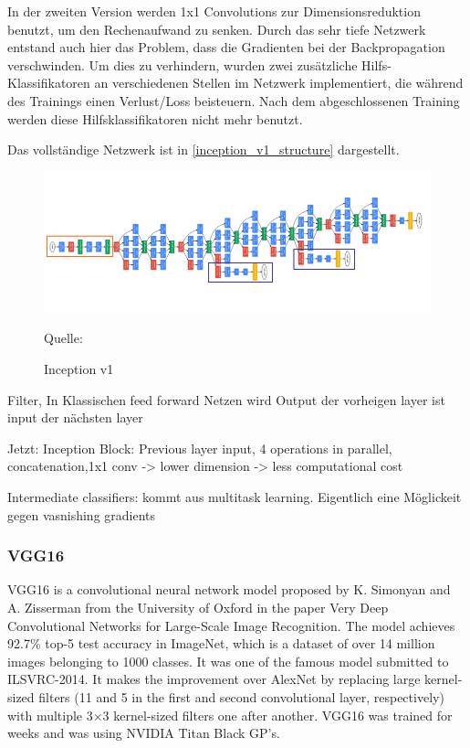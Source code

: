 \documentclass[11pt,a4paper]{article}
\newcommand{\source}[1]{\caption*{\hfill Quelle: {#1}} }
\numberwithin{equation}{section}
\begin{document}
	In der zweiten Version werden 1x1 Convolutions zur Dimensionsreduktion benutzt, um den Rechenaufwand zu senken.
	Durch das sehr tiefe Netzwerk entstand auch hier das Problem, dass die Gradienten bei der Backpropagation verschwinden. Um dies zu verhindern, wurden zwei zusätzliche Hilfs-Klassifikatoren an verschiedenen Stellen im Netzwerk implementiert, die während des Trainings einen Verlust/Loss beisteuern. Nach dem abgeschlossenen Training werden diese Hilfsklassifikatoren nicht mehr benutzt.
	
	Das vollständige Netzwerk ist in \autoref{inception_v1_structure} dargestellt.
	
	\begin{figure}
		\centering
		
			\centering
			\includegraphics[width=.7\linewidth]{inception_v1_structure.png}
		
		\caption{Inception v1}
		\source{\cite{goingdeeperwithconvolutions}}
		
		\label{inception_v1_structure}
	\end{figure}
	
	Filter,
	In Klassischen feed forward Netzen wird Output der vorheigen layer ist input der nächsten layer
	
	Jetzt: Inception Block: Previous layer input, 4 operations in parallel, concatenation,1x1 conv -> lower dimension -> less computational cost
	
	Intermediate classifiers: kommt aus multitask learning. Eigentlich eine Möglickeit gegen vasnishing gradients
	
	\subsubsection{VGG16}
	VGG16 is a convolutional neural network model proposed by K. Simonyan and A. Zisserman from the University of Oxford in the paper Very Deep Convolutional Networks for Large-Scale Image Recognition. The model achieves 92.7\% top-5 test accuracy in ImageNet, which is a dataset of over 14 million images belonging to 1000 classes. It was one of the famous model submitted to ILSVRC-2014. It makes the improvement over AlexNet by replacing large kernel-sized filters (11 and 5 in the first and second convolutional layer, respectively) with multiple 3×3 kernel-sized filters one after another. VGG16 was trained for weeks and was using NVIDIA Titan Black GP’s.\cite{vgg16_neurohive, vgg16_architecture}
	
\end{document}
